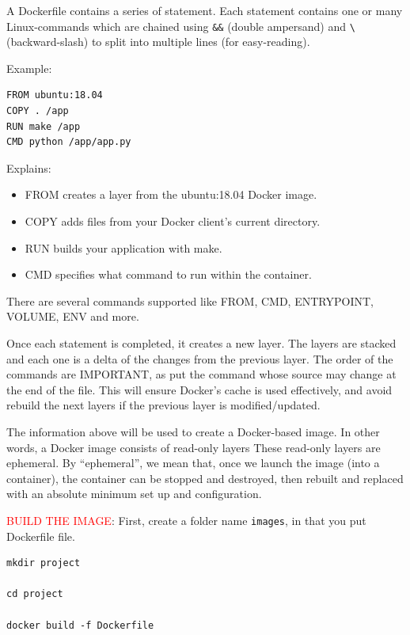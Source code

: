 A Dockerfile contains a series of statement. Each statement contains one or many Linux-commands which are chained using 
\verb!&&! (double ampersand) and \verb!\! (backward-slash) to split into multiple lines (for easy-reading).

Example:
\begin{verbatim}
FROM ubuntu:18.04
COPY . /app
RUN make /app
CMD python /app/app.py
\end{verbatim}

Explains:
\begin{itemize}
  \item  FROM creates a layer from the ubuntu:18.04 Docker image.

  \item COPY adds files from your Docker client’s current directory.
  
  \item RUN builds your application with make.
  
  \item CMD specifies what command to run within the container.
\end{itemize}
There are several commands supported like FROM, CMD,
ENTRYPOINT, VOLUME, ENV and more.

Once each statement is completed, it creates a new layer.
The layers are stacked and each one is a delta of the changes from the previous
layer.
The order of the commands are IMPORTANT, as put the command whose source may
change at the end of the file.
This will ensure Docker's cache is used effectively, and avoid rebuild the next
layers if the previous layer is modified/updated.

The information above will be used to create a Docker-based image.
In other words, a Docker image consists of read-only layers These read-only
layers are ephemeral. By “ephemeral”, we mean that, once we launch the image
(into a container),  the container can be stopped and destroyed, then rebuilt
and replaced with an absolute minimum set up and configuration.

\textcolor{red}{BUILD THE IMAGE}: First, create a folder name \verb!images!, in that you put Dockerfile file.
\begin{verbatim}
mkdir project

cd project

docker build -f Dockerfile
\end{verbatim}


